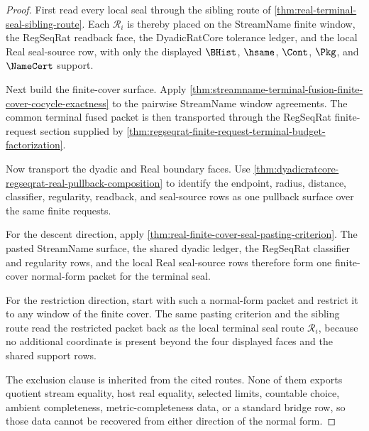 \begin{proof}
First read every local seal through the sibling route of
\autoref{thm:real-terminal-seal-sibling-route}. Each $\mathcal R_i$ is thereby
placed on the StreamName finite window, the RegSeqRat readback face, the
DyadicRatCore tolerance ledger, and the local Real seal-source row, with only
the displayed $\BHist$, $\hsame$, $\Cont$, $\Pkg$, and $\NameCert$ support.

Next build the finite-cover surface. Apply
\autoref{thm:streamname-terminal-fusion-finite-cover-cocycle-exactness} to the
pairwise StreamName window agreements. The common terminal fused packet is
then transported through the RegSeqRat finite-request section supplied by
\autoref{thm:regseqrat-finite-request-terminal-budget-factorization}.

Now transport the dyadic and Real boundary faces. Use
\autoref{thm:dyadicratcore-regseqrat-real-pullback-composition} to identify
the endpoint, radius, distance, classifier, regularity, readback, and
seal-source rows as one pullback surface over the same finite requests.

For the descent direction, apply
\autoref{thm:real-finite-cover-seal-pasting-criterion}. The pasted
StreamName surface, the shared dyadic ledger, the RegSeqRat classifier and
regularity rows, and the local Real seal-source rows therefore form one
finite-cover normal-form packet for the terminal seal.

For the restriction direction, start with such a normal-form packet and
restrict it to any window of the finite cover. The same pasting criterion and
the sibling route read the restricted packet back as the local terminal seal
route $\mathcal R_i$, because no additional coordinate is present beyond the
four displayed faces and the shared support rows.

The exclusion clause is inherited from the cited routes. None of them exports
quotient stream equality, host real equality, selected limits, countable
choice, ambient completeness, metric-completeness data, or a standard bridge
row, so those data cannot be recovered from either direction of the normal
form.
\end{proof}

